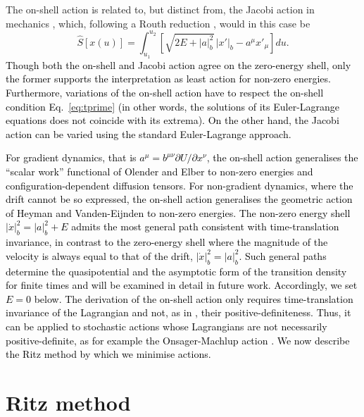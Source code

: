 The on-shell action is related to, but distinct from, the Jacobi action
in mechanics \citep{landau1959classical, gantmachner}, which, following
a Routh reduction \citep{whittaker1988}, would in this case be
\[
\hat{S}[x(u)]=\int_{u_{1}}^{u_{2}}\left[\sqrt{2E+|a|_{b}^{2}}\,|x'|_{b}-a^{\mu}x'_{\mu}\right]du.
\]
\textcolor{black}{Though both the on-shell and Jacobi action agree
on the zero-energy shell, only the former supports the interpretation
as least action for non-zero energies. Furthermore, variations of
the on-shell action have to respect the on-shell condition Eq.~\ref{eq:tprime}
(in other words, the solutions of its Euler-Lagrange equations does
not coincide with its extrema). On the other hand, the Jacobi action
can be varied using the standard Euler-Lagrange approach.}

\textcolor{black}{For gradient dynamics, that is $a^{\mu}=b^{\mu\nu}\partial U/\partial x^{\nu}$,
the on-shell action generalises the ``scalar work'' functional of
Olender and Elber \citep{olender1997yet} to non-zero energies and
configuration-dependent diffusion tensors. For non-gradient dynamics,
where the drift cannot be so expressed, the on-shell action generalises
the geometric action of Heyman and Vanden-Eijnden \citep{heymannGeometricMinimumAction2008a}
to non-zero energies. The non-zero energy shell $|\dot{x}|_{b}^{2}=|a|_{b}^{2}+E$
admits the most general path consistent with time-translation invariance,
in contrast to the zero-energy shell where the magnitude of the velocity
is always equal to that of the drift, $|\dot{x}|_{b}^{2}=|a|_{b}^{2}$.
Such general paths determine the quasipotential and the asymptotic
form of the transition density for finite times and will be examined
in detail in future work. Accordingly, we set $E=0$ below. The derivation
of the on-shell action only requires time-translation invariance of
the Lagrangian and not, as in \citep{olender1997yet, heymannGeometricMinimumAction2008a},
their positive-definiteness. Thus, it can be applied to stochastic
actions whose Lagrangians are not necessarily positive-definite, as
for example the Onsager-Machlup action \citep{onsagerFluctuationsIrreversibleProcesses1953a, stratonovichMarkovMethodsTheory1989a}.
We now describe the Ritz method by which we minimise actions. }

\section{Ritz method} \label{sec:direct-method}

